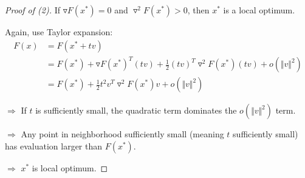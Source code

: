 \begin{proof}[Proof of (2)]
	If $\triangledown F(x^*) = 0$ and $\triangledown^2 F(x^*) > 0$, then $x^*$ is a local optimum.
	
	Again, use Taylor expansion: 
	\begin{align*}
	F(x) &= F(x^* + tv) \\
	&= F(x^*) + \triangledown F(x^*)^T(tv) + \frac{1}{2}(tv)^T\triangledown^2F(x^*)(tv) + o(\Vert v \Vert^2)\\
	&= F(x^*) + \frac{1}{2}t^2v^T\triangledown^2F(x^*)v + o(\Vert v \Vert^2)
	\end{align*}
	
	$\Rightarrow$ If $t$ is sufficiently small, the quadratic term dominates the $o(\Vert v \Vert^2)$ term.
	
	$\Rightarrow$ Any point in neighborhood sufficiently small (meaning $t$ sufficiently small) has evaluation larger than $F(x^*)$.
	
	$\Rightarrow$ $x^*$ is local optimum. 
\end{proof}

